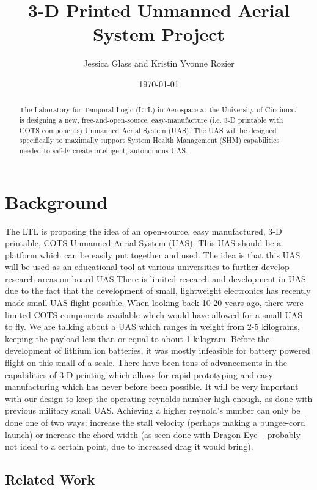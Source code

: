 \documentclass[]{article}
\title{3-D Printed Unmanned Aerial System Project}
\author{
Jessica Glass %
and Kristin Yvonne Rozier %
}
\affil{University of Cincinnati, Cincinnati, Ohio, USA \\
   \texttt{\{glassjp,rozierky\}@ucmail.uc.edu}
}
\date{\today}
\begin{document}
\maketitle


\begin{abstract}
The Laboratory for Temporal Logic (LTL) in Aerospace at the University of Cincinnati is designing a new, free-and-open-source, easy-manufacture (i.e. 3-D printable with COTS components) Unmanned Aerial System (UAS). The UAS will be designed specifically to maximally support System Health Management (SHM) capabilities needed to safely create intelligent, autonomous UAS.

\end{abstract}

\printnomenclature

\section{Background}
The LTL is proposing the idea of an open-source, easy manufactured, 3-D printable, COTS Unmanned Aerial System (UAS).  This UAS should be a platform which can be easily put together and used.  The idea is that this UAS will be used as an educational tool at various universities to further develop research areas on-board UAS  There is limited research and development in UAS due to the fact that the development of small, lightweight electronics has recently made small UAS flight possible.  When looking back 10-20 years ago, there were limited COTS components available which would have allowed for a small UAS to fly.  We are talking about a UAS which ranges in weight from 2-5 kilograms, keeping the payload less than or equal to about 1 kilogram.  Before the development of lithium ion batteries, it was mostly infeasible for battery powered flight on this small of a scale. There have been tons of advancements in the capabilities of 3-D printing which allows for rapid prototyping and easy manufacturing which has never before been possible.  It will be very important with our design to keep the operating reynolds number high enough, as done with previous military small UAS.  Achieving a higher reynold's number can only be done one of two ways: increase the stall velocity (perhaps making a bungee-cord launch) or increase the chord width (as seen done with Dragon Eye -- probably not ideal to a certain point, due to increased drag it would bring).   \\


\subsection{Related Work}
\end{document}
